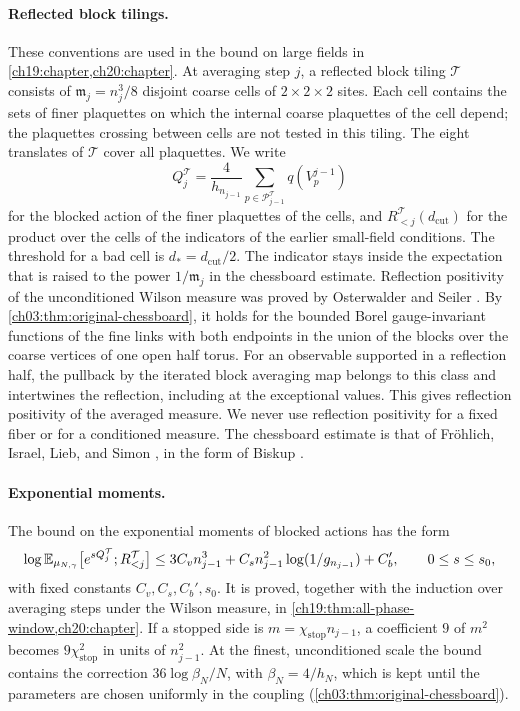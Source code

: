 \paragraph{Reflected block tilings.}
These conventions are used in the bound on large fields in \cref{ch19:chapter,ch20:chapter}. At averaging step $j$, a reflected block tiling $\mathcal T$ consists of $\mathfrak m_j=n_j^3/8$ disjoint coarse cells of $2\times2\times2$ sites. Each cell contains the sets of finer plaquettes on which the internal coarse plaquettes of the cell depend; the plaquettes crossing between cells are not tested in this tiling. The eight translates of $\mathcal T$ cover all plaquettes. We write
\[
 Q_j^{\mathcal T}=\frac4{h_{n_{j-1}}}\sum_{p\in\mathcal P_{j-1}^{\mathcal T}}q(V_p^{j-1})
\]
for the blocked action of the finer plaquettes of the cells, and $R_{<j}^{\mathcal T}(d_{\mathrm{cut}})$ for the product over the cells of the indicators of the earlier small-field conditions. The threshold for a bad cell is $d_*=d_{\mathrm{cut}}/2$. The indicator stays inside the expectation that is raised to the power $1/\mathfrak m_j$ in the chessboard estimate. Reflection positivity of the unconditioned Wilson measure was proved by Osterwalder and Seiler \cite{OsterwalderSeiler1978}. By \cref{ch03:thm:original-chessboard}, it holds for the bounded Borel gauge-invariant functions of the fine links with both endpoints in the union of the blocks over the coarse vertices of one open half torus. For an observable supported in a reflection half, the pullback by the iterated block averaging map belongs to this class and intertwines the reflection, including at the exceptional values. This gives reflection positivity of the averaged measure. We never use reflection positivity for a fixed fiber or for a conditioned measure. The chessboard estimate is that of Fröhlich, Israel, Lieb, and Simon \cite{FILS1978,FILS1980}, in the form of Biskup \cite[Theorem~5.8, p.~44]{Biskup2009}.

\paragraph{Exponential moments.}
The bound on the exponential moments of blocked actions has the form
\[
 \log\mathbb E_{\mu_{N,\gamma}}\bigl[e^{sQ_j^{\mathcal T}};R_{<j}^{\mathcal T}\bigr]
 \le 3C_vn_{j-1}^3+C_sn_{j-1}^2\log(1/g_{n_{j-1}})+C_b',
 \qquad 0\le s\le s_0,
\]
with fixed constants $C_v,C_s,C_b',s_0$. It is proved, together with the induction over averaging steps under the Wilson measure, in \cref{ch19:thm:all-phase-window,ch20:chapter}. If a stopped side is $m=\chi_{\mathrm{stop}}n_{j-1}$, a coefficient $9$ of $m^2$ becomes $9\chi_{\mathrm{stop}}^2$ in units of $n_{j-1}^2$. At the finest, unconditioned scale the bound contains the correction $36\log\beta_N/N$, with $\beta_N=4/h_N$, which is kept until the parameters are chosen uniformly in the coupling (\cref{ch03:thm:original-chessboard}).


